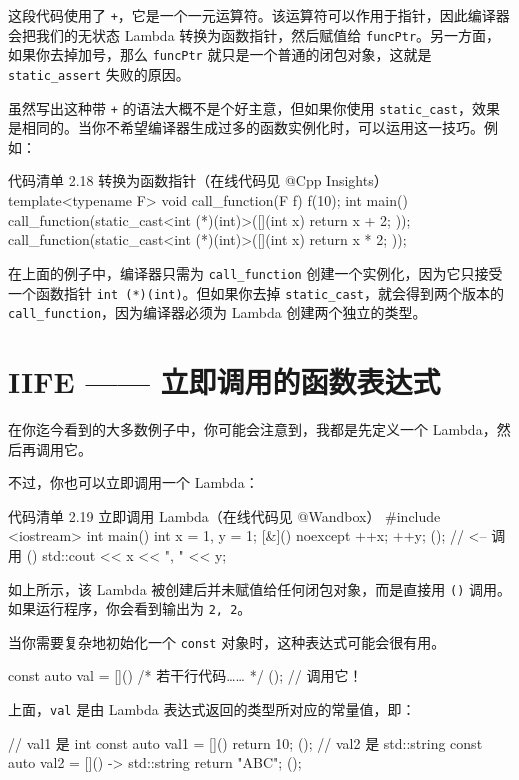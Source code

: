 \begin{codebox}
这段代码使用了 \texttt{+}，它是一个一元运算符。该运算符可以作用于指针，因此编译器会把我们的无状态 Lambda 转换为函数指针，然后赋值给 \texttt{funcPtr}。另一方面，如果你去掉加号，那么 \texttt{funcPtr} 就只是一个普通的闭包对象，这就是 \texttt{static\_assert} 失败的原因。

虽然写出这种带 \texttt{+} 的语法大概不是个好主意，但如果你使用 \texttt{static\_cast}，效果是相同的。当你不希望编译器生成过多的函数实例化时，可以运用这一技巧。例如：

\begin{codeboxt}{代码清单 2.18 转换为函数指针（在线代码见 @Cpp Insights）}
template<typename F>
void call_function(F f) {
f(10);
}
int main() {
call_function(static_cast<int (*)(int)>([](int x){
return x + 2; }));
call_function(static_cast<int (*)(int)>([](int x){
return x * 2; }));
}
\end{codeboxt}

在上面的例子中，编译器只需为 \texttt{call\_function} 创建一个实例化，因为它只接受一个函数指针 \texttt{int (*)(int)}。但如果你去掉 \texttt{static\_cast}，就会得到两个版本的 \texttt{call\_function}，因为编译器必须为 Lambda 创建两个独立的类型。

\section{IIFE —— 立即调用的函数表达式}

在你迄今看到的大多数例子中，你可能会注意到，我都是先定义一个 Lambda，然后再调用它。

不过，你也可以立即调用一个 Lambda：

\begin{codeboxt}{代码清单 2.19 立即调用 Lambda（在线代码见 @Wandbox）}
#include <iostream>
int main() {
int x = 1, y = 1;
[&]() noexcept { ++x; ++y; }(); // <-- 调用 ()
std::cout << x << ", " << y;
}
\end{codeboxt}

如上所示，该 Lambda 被创建后并未赋值给任何闭包对象，而是直接用 \texttt{()} 调用。如果运行程序，你会看到输出为 \texttt{2, 2}。

当你需要复杂地初始化一个 \texttt{const} 对象时，这种表达式可能会很有用。

\begin{codebox}
const auto val = []() {
/* 若干行代码…… */
}(); // 调用它！
\end{codebox}

上面，\texttt{val} 是由 Lambda 表达式返回的类型所对应的常量值，即：

\begin{codebox}
// val1 是 int
const auto val1 = []() { return 10; }();
// val2 是 std::string
const auto val2 = []() -> std::string { return "ABC"; }();
\end{codebox}


\end{codebox}
